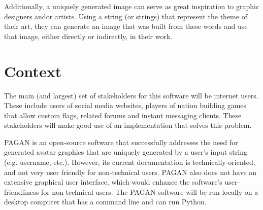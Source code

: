 \documentclass[12pt, letterpaper]{article}
\begin{document}
Additionally, a uniquely generated image can serve as great inspiration to graphic designers and\/or artists. Using a string (or strings) that represent the theme of their art, they can generate an image that was built from these words and use that image, either directly or indirectly, in their work.


\section{Context}
The main (and largest) set of stakeholders for this software will be internet users. These include users of social media websites, players of nation building games that allow custom flags, related forums and instant messaging clients. These stakeholders will make good use of an implementation that solves this problem.

PAGAN is an open-source software that successfully addresses the need for generated avatar graphics that are uniquely generated by a user’s input string (e.g. username, etc.). However, its current documentation is technically-oriented, and not very user friendly for non-technical users. PAGAN also does not have an extensive graphical user interface, which would enhance the software's user-friendliness for non-technical users. The PAGAN software will be run locally on a desktop computer that has a command line and can run Python.
\end{document}
